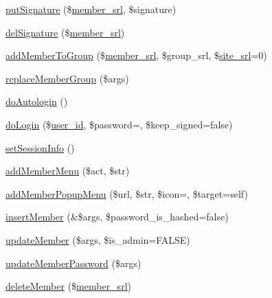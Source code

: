 \begin{DoxyCompactItemize}
\item 
\hyperlink{classmemberController_a084c3af4daea1a860f95e06f2bc5fc28}{put\+Signature} (\$\hyperlink{ko_8install_8php_aa61f9e08f0fe505094d26f8143f30bbd}{member\+\_\+srl}, \$signature)
\item 
\hyperlink{classmemberController_a0fa2ec662eb7a40333ca2049a103385e}{del\+Signature} (\$\hyperlink{ko_8install_8php_aa61f9e08f0fe505094d26f8143f30bbd}{member\+\_\+srl})
\item 
\hyperlink{classmemberController_aca7533f0e95df7227073436c24827c7b}{add\+Member\+To\+Group} (\$\hyperlink{ko_8install_8php_aa61f9e08f0fe505094d26f8143f30bbd}{member\+\_\+srl}, \$group\+\_\+srl, \$\hyperlink{ko_8install_8php_a8b1406b4ad1048041558dce6bfe89004}{site\+\_\+srl}=0)
\item 
\hyperlink{classmemberController_acc92443cdd02e55cec12099722482737}{replace\+Member\+Group} (\$args)
\item 
\hyperlink{classmemberController_aeb2590d01346c9a25c2b22f99429f6a3}{do\+Autologin} ()
\item 
\hyperlink{classmemberController_a693e381ca8a8b8235d92659ea96684a1}{do\+Login} (\$\hyperlink{ko_8install_8php_a74f1a394389d774e5b4cd5d1d15413f7}{user\+\_\+id}, \$password=\textquotesingle{}\textquotesingle{}, \$keep\+\_\+signed=false)
\item 
\hyperlink{classmemberController_ae4175b4a60e0b3000ed12e36508720ad}{set\+Session\+Info} ()
\item 
\hyperlink{classmemberController_aaa52725f8ba9ba16cfe4b350a51d7420}{add\+Member\+Menu} (\$act, \$str)
\item 
\hyperlink{classmemberController_a9672e0e43f813d6e791ab62543fc78b0}{add\+Member\+Popup\+Menu} (\$url, \$str, \$icon=\textquotesingle{}\textquotesingle{}, \$target=\textquotesingle{}self\textquotesingle{})
\item 
\hyperlink{classmemberController_ae588324b8e86b9259e40d104b4d2b42d}{insert\+Member} (\&\$args, \$password\+\_\+is\+\_\+hashed=false)
\item 
\hyperlink{classmemberController_ac1ad3397eda0a695046b023a14d25496}{update\+Member} (\$args, \$is\+\_\+admin=F\+A\+L\+SE)
\item 
\hyperlink{classmemberController_aed05d2a367f7e7a5b70fcbd0b4a08e74}{update\+Member\+Password} (\$args)
\item 
\hyperlink{classmemberController_a5170b3fafc449f4cc6fc599c093fcc06}{delete\+Member} (\$\hyperlink{ko_8install_8php_aa61f9e08f0fe505094d26f8143f30bbd}{member\+\_\+srl})
\item 

\end{DoxyCompactItemize}
